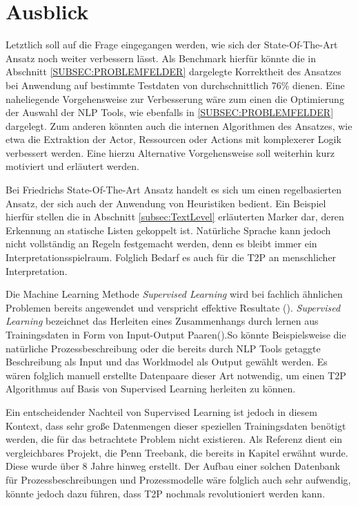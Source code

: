 \section{Ausblick}
Letztlich soll auf die Frage eingegangen werden, wie sich der State-Of-The-Art Ansatz noch weiter verbessern lässt. Als Benchmark hierfür könnte die in Abschnitt \ref{SUBSEC:PROBLEMFELDER} dargelegte Korrektheit des Ansatzes bei Anwendung auf bestimmte Testdaten von durchschnittlich 76\% dienen. Eine naheliegende Vorgehensweise zur Verbesserung wäre zum einen die Optimierung der Auswahl der \ac{NLP} Tools, wie ebenfalls in \ref{SUBSEC:PROBLEMFELDER} dargelegt. Zum anderen könnten auch die internen Algorithmen des Ansatzes, wie etwa die Extraktion der Actor, Ressourcen oder Actions mit komplexerer Logik verbessert werden. Eine hierzu Alternative Vorgehensweise soll weiterhin kurz motiviert und erläutert werden.\par  
Bei Friedrichs State-Of-The-Art Ansatz handelt es sich um einen regelbasierten Ansatz, der sich auch der Anwendung von Heuristiken bedient. Ein Beispiel hierfür stellen die in Abschnitt \ref{subsec:TextLevel} erläuterten Marker dar, deren Erkennung an statische Listen gekoppelt ist. Natürliche Sprache kann jedoch nicht vollständig an Regeln festgemacht werden, denn es bleibt immer ein Interpretationsspielraum. Folglich Bedarf es auch für die \ac{T2P} an menschlicher Interpretation. \par
Die Machine Learning Methode \textit{Supervised Learning} wird bei fachlich ähnlichen Problemen bereits angewendet und verspricht effektive Resultate (\cite[vgl.][2]{BPMML}). \textit{Supervised Learning} bezeichnet das Herleiten eines Zusammenhangs durch lernen aus Trainingsdaten in Form von Input-Output Paaren(\cite[vgl.][695]{AIMODERN}).So könnte Beispielsweise die natürliche Prozessbeschreibung oder die bereits durch \ac{NLP} Tools getaggte Beschreibung als Input und das Worldmodel als Output gewählt werden. Es wären folglich manuell erstellte Datenpaare dieser Art notwendig, um einen \ac{T2P} Algorithmus auf Basis von Supervised Learning herleiten zu können.\par
Ein entscheidender Nachteil von Supervised Learning ist jedoch in diesem Kontext, dass sehr große Datenmengen dieser speziellen Trainingsdaten benötigt werden, die für das betrachtete Problem nicht existieren. Als Referenz dient ein vergleichbares Projekt, die Penn Treebank, die bereits in Kapitel \label{subsec:pos} erwähnt wurde. Diese wurde über 8 Jahre hinweg erstellt. Der Aufbau einer solchen Datenbank für Prozessbeschreibungen und Prozessmodelle wäre folglich auch sehr aufwendig, könnte jedoch dazu führen, dass \ac{T2P} nochmals revolutioniert werden kann.
